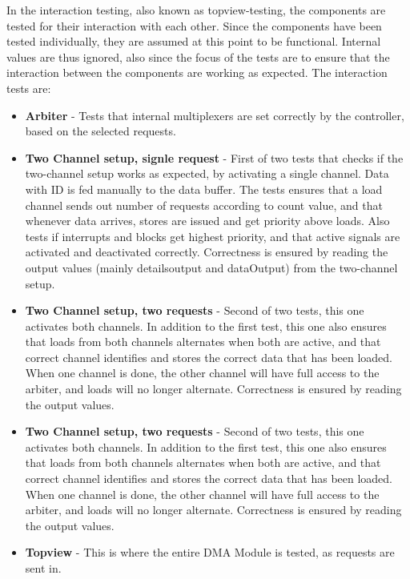 In the interaction testing, also known as topview-testing, the components are tested for their interaction with each other.
Since the components have been tested individually, they are assumed at this point to be functional. 
Internal values are thus ignored, also since the focus of the tests are to ensure that the interaction between the components are working as expected.
The interaction tests are:
\begin{itemize}
    \item \textbf{Arbiter} - Tests that internal multiplexers are set correctly by the controller, based on the selected requests.
    \item \textbf{Two Channel setup, signle request} - First of two tests that checks if the two-channel setup works as expected, by activating a single channel.
    Data with ID is fed manually to the data buffer.
    The tests ensures that a load channel sends out number of requests according to count value, and that whenever data arrives, stores are issued and get priority above loads.
    Also tests if interrupts and blocks get highest priority, and that active signals are activated and deactivated correctly.
    Correctness is ensured by reading the output values (mainly detailsoutput and dataOutput) from the two-channel setup.
    \item \textbf{Two Channel setup, two requests} - Second of two tests, this one activates both channels.
    In addition to the first test, this one also ensures that loads from both channels alternates when both are active, and that correct channel identifies and stores the correct data that has been loaded.
    When one channel is done, the other channel will have full access to the arbiter, and loads will no longer alternate.
    Correctness is ensured by reading the output values. 
    \item \textbf{Two Channel setup, two requests} - Second of two tests, this one activates both channels.
    In addition to the first test, this one also ensures that loads from both channels alternates when both are active, and that correct channel identifies and stores the correct data that has been loaded.
    When one channel is done, the other channel will have full access to the arbiter, and loads will no longer alternate.
    Correctness is ensured by reading the output values.
    \item \textbf{Topview} - This is where the entire DMA Module is tested, as requests are sent in.

\end{itemize}
